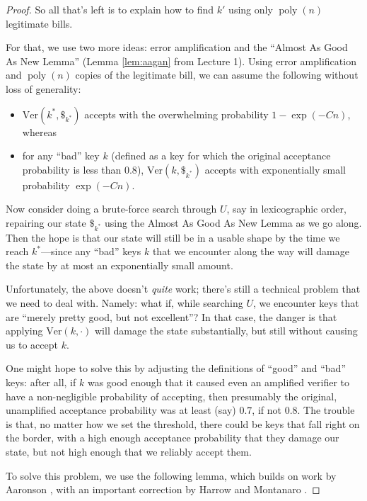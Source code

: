 \documentclass[11pt]{report}
\theoremstyle{plain}
\theoremstyle{definition}
\newcommand{\poly}{\operatorname{poly}}
\begin{document}
\begin{proof}
So all that's left is to explain how to find $k'$ using only $\poly(n)$ legitimate bills.

For that, we use two more ideas: error amplification and the ``Almost As Good As New Lemma'' (Lemma \ref{lem:aagan} from Lecture 1).  Using error amplification and $\poly(n)$ copies of the legitimate bill, we can assume the following without loss of generality:
\begin{itemize}
\item $\mathrm{Ver}(k^\ast, \$_{k^\ast})$ accepts with the overwhelming probability $1-\exp(-Cn)$, whereas
\item for any ``bad'' key $k$ (defined as a key for which the original acceptance probability is less than $0.8$), $\mathrm{Ver}(k, \$_{k^\ast})$ accepts with exponentially small probability $\exp(-Cn)$.
\end{itemize}
Now consider doing a brute-force search through $U$, say in lexicographic order, repairing our state $\$_{k^\ast}$ using the Almost As Good As New Lemma as we go along.  Then the hope is that our state will still be in a usable shape by the time we reach $k^\ast$---since any ``bad'' keys $k$ that we encounter along the way will damage the state by at most an exponentially small amount.

Unfortunately, the above doesn't {\em quite} work; there's still a technical problem that we need to deal with.  Namely: what if, while searching $U$, we encounter keys that are ``merely pretty good, but not excellent''?  In that case, the danger is that applying $\mathrm{Ver}(k,\cdot)$ will damage the state substantially, but still without causing us to accept $k$.

One might hope to solve this by adjusting the definitions of ``good'' and ``bad'' keys: after all, if $k$ was good enough that it caused even an amplified verifier to have a non-negligible probability of accepting, then presumably the original, unamplified acceptance probability was at least (say) $0.7$, if not $0.8$.  The trouble is that, no matter how we set the threshold, there could be keys that fall right on the border, with a high enough acceptance probability that they damage our state, but not high enough that we reliably accept them.

To solve this problem, we use the following lemma, which builds on work by Aaronson \cite{aar:qmaqpoly}, with an important correction by Harrow and Montanaro \cite{hm16}.
\end{proof}
\end{document}
